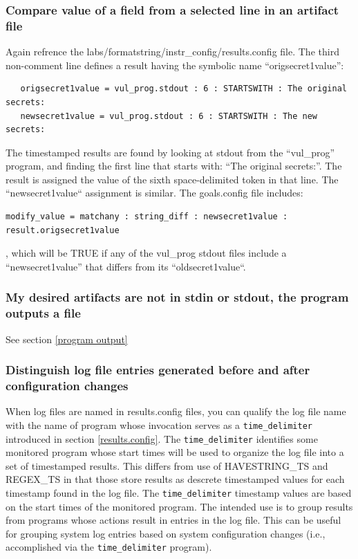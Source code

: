 \documentclass[12pt]{article}
\begin{document}
\subsubsection{Compare value of a field from a selected line in an artifact file}
Again refrence the labs/formatstring/instr\_config/results.config file.  The third non-comment line
defines a result having the symbolic name ``origsecret1value'':  
\begin{verbatim}
   origsecret1value = vul_prog.stdout : 6 : STARTSWITH : The original secrets:
   newsecret1value = vul_prog.stdout : 6 : STARTSWITH : The new secrets:
\end{verbatim}
\noindent The timestamped results are
found by looking at stdout from the ``vul\_prog'' program, and finding the first line that starts with:
``The original secrets:''.  The result is assigned the value of the sixth space-delimited 
token in that line.  The ``newsecret1value`` assignment is similar.  The goals.config file includes:
\begin{verbatim}
modify_value = matchany : string_diff : newsecret1value : result.origsecret1value
\end{verbatim}
\noindent , which will be TRUE if any of the vul\_prog stdout files include a
``newsecret1value'' that differs from its ``oldsecret1value``.

\subsubsection{My desired artifacts are not in stdin or stdout, the program outputs a file}
See section \ref{program output}

\subsubsection{Distinguish log file entries generated before and after configuration changes}
\label{time delimeter}
When log files are named in results.config files, you can qualify the log file name
with the name of program whose invocation serves as a {\tt time\_delimiter} introduced
in section \ref{results.config}.
The {\tt time\_delimiter} identifies some
monitored program whose start times will be used to organize the log file into
a set of timestamped results.  This differs from use of HAVESTRING\_TS and
REGEX\_TS in that those store results as descrete timestamped values for each
timestamp found in the log file.  The {\tt time\_delimiter} timestamp values are
based on the start times of the monitored program.  The intended use is to
group results from programs whose actions result in entries in the log file.
This can be useful for grouping system log entries based on system configuration
changes (i.e., accomplished via the {\tt time\_delimiter} program). 
\end{document}
